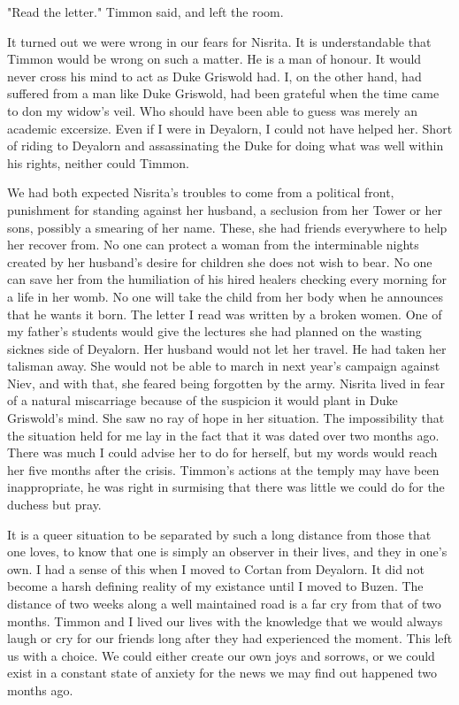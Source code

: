 \documentclass{article}
\begin{document}
"Read the letter." Timmon said, and left the room.

It turned out we were wrong in our fears for Nisrita. It is understandable that Timmon would be wrong on such a matter. He is a man of honour. It would never cross his mind to act as Duke Griswold had. I, on the other hand, had suffered from a man like Duke Griswold, had been grateful when the time came to don my widow's veil. Who should have been able to guess was merely an academic excersize. Even if I were in Deyalorn, I could not have helped her. Short of riding to Deyalorn and assassinating the Duke for doing what was well within his rights, neither could Timmon. 

We had both expected Nisrita's troubles to come from a political front, punishment for standing against her husband, a seclusion from her Tower or her sons, possibly a smearing of her name. These, she had friends everywhere to help her recover from. No one can protect a woman from the interminable nights created by her husband's desire for children she does not wish to bear. No one can save her from the humiliation of his hired healers checking every morning for a life in her womb. No one will take the child from her body when he announces that he wants it born. The letter I read was written by a broken women. One of my father's students would give the lectures she had planned on the wasting sicknes side of Deyalorn. Her husband would not let her travel. He had taken her talisman away. She would not be able to march in next year's campaign against Niev, and with that, she feared being forgotten by the army. Nisrita lived in fear of a natural miscarriage because of the suspicion it would plant in Duke Griswold's mind. She saw no ray of hope in her situation. The impossibility that the situation held for me lay in the fact that it was dated over two months ago. There was much I could advise her to do for herself, but my words would reach her five months after the crisis. Timmon's actions at the temply may have been inappropriate, he was right in surmising that there was little we could do for the duchess but pray.

\vspace{.5cm}

It is a queer situation to be separated by such a long distance from those that one loves, to know that one is simply an observer in their lives, and they in one's own. I had a sense of this when I moved to Cortan from Deyalorn. It did not become a harsh defining reality of my existance until I moved to Buzen. The distance of two weeks along a well maintained road is a far cry from that of two months. Timmon and I lived our lives with the knowledge that we would always laugh or cry for our friends long after they had experienced the moment. This left us with a choice. We could either create our own joys and sorrows, or we could exist in a constant state of anxiety for the news we may find out happened two months ago. 
\end{document}
